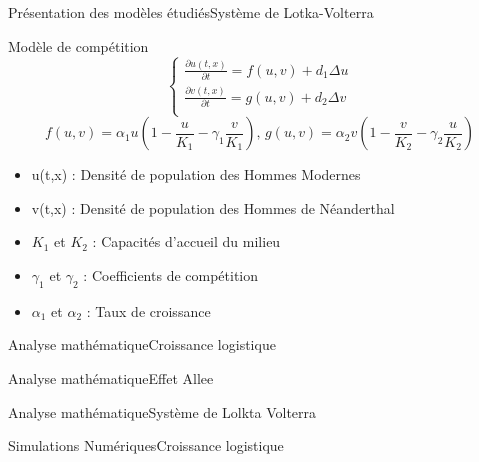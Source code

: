 \documentclass[10pt]{beamer}
\begin{document}
\begin{frame}{Présentation des modèles étudiés}{Système de Lotka-Volterra}
\begin{block}{Modèle de compétition}
	$$\begin{cases} \frac{\partial u(t,x)}{\partial t} = f(u,v) + d_1\Delta u\\ \frac{\partial v(t,x)}{\partial t} = g(u,v) + d_2 \Delta v \\ 
\end{cases}$$
	$$f(u,v) = \alpha_1 u\left(1-\frac{u}{K_1}-\gamma_1\frac{v}{K_1}\right) \text{, } g(u,v) = \alpha_2 v\left(1-\frac{v}{K_2}-\gamma_2\frac{u}{K_2}\right)$$
\end{block}
\begin{itemize}
	\item u(t,x) : Densité de population des Hommes Modernes 
    \item v(t,x) : Densité de population des Hommes de Néanderthal 
    \item $K_1$ et $K_2$ : Capacités d'accueil du milieu
    \item $\gamma_1$ et $\gamma_2$ : Coefficients de compétition
    \item $\alpha_1$ et $\alpha_2$ : Taux de croissance
\end{itemize}
\end{frame}

\begin{frame}{Analyse mathématique}{Croissance logistique}
\end{frame}

\begin{frame}{Analyse mathématique}{Effet Allee}
\end{frame}

\begin{frame}{Analyse mathématique}{Système de Lolkta Volterra}
\end{frame}

\begin{frame}{Simulations Numériques}{Croissance logistique}
\end{frame}
\end{document}
